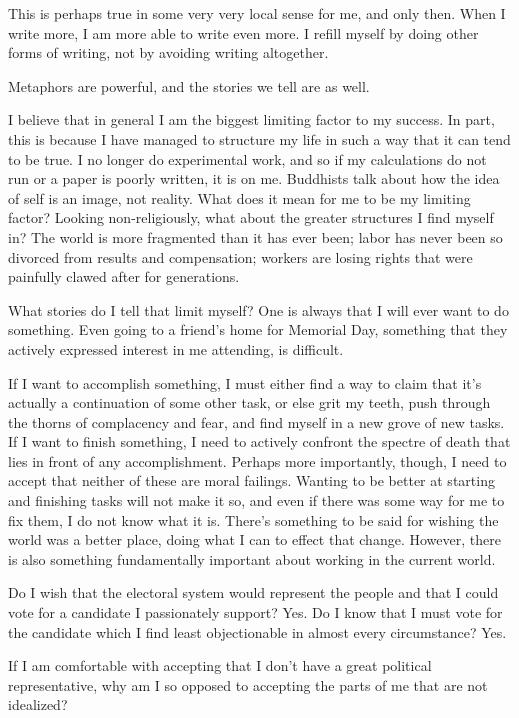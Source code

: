 \documentclass[12pt]{article}
\renewcommand{\,}{\textsuperscript{,}}
\begin{document}
This is perhaps true in some very very local sense for me, and only then.  
When I write more, I am more able to write even more.  
I refill myself by doing other forms of writing, not by avoiding writing altogether.

Metaphors are powerful, and the stories we tell are as well.

I believe that in general I am the biggest limiting factor to my success.  
In part, this is because I have managed to structure my life in such a way that it can tend to be true.  
I no longer do experimental work, and so if my calculations do not run or a paper is poorly written, it is on me.  
Buddhists talk about how the idea of self is an image, not reality.  
What does it mean for me to be my limiting factor?  
Looking non-religiously, what about the greater structures I find myself in?  
The world is more fragmented than it has ever been; labor has never been so divorced from results and compensation; workers are losing rights that were painfully clawed after for generations.

What stories do I tell that limit myself?  
One is always that I will ever want to do something.  
Even going to a friend's home for Memorial Day, something that they actively expressed interest in me attending, is difficult.

If I want to accomplish something, I must either find a way to claim that it's actually a continuation of some other task, or else grit my teeth, push through the thorns of complacency and fear, and find myself in a new grove of new tasks.  
If I want to finish something, I need to actively confront the spectre of death that lies in front of any accomplishment.  
Perhaps more importantly, though, I need to accept that neither of these are moral failings.  
Wanting to be better at starting and finishing tasks will not make it so, and even if there was some way for me to fix them, I do not know what it is.  
There's something to be said for wishing the world was a better place, doing what I can to effect that change.  
However, there is also something fundamentally important about working in the current world.

Do I wish that the electoral system would represent the people and that I could vote for a candidate I passionately support?  
Yes.  
Do I know that I must vote for the candidate which I find least objectionable in almost every circumstance?  
Yes.

If I am comfortable with accepting that I don't have a great political representative, why am I so opposed to accepting the parts of me that are not idealized?
\end{document}
